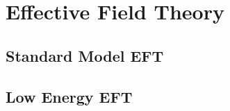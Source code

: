 \chapter{Effective Field Theory}
\label{sec:EFT}

\section{Standard Model EFT}

\section{Low Energy EFT}